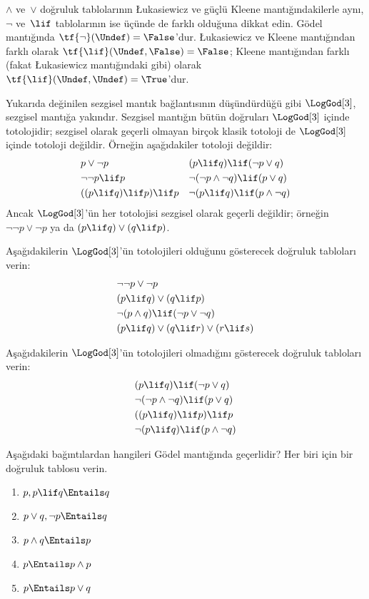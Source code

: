 \documentclass[../../../include/open-logic-section]{subfiles}
\begin{document}
$\land$ ve~$\lor$ doğruluk tablolarının \L ukasiewicz ve güçlü Kleene
mantığındakilerle aynı, $\lnot$ ve~$\lif$ tablolarının ise üçünde de farklı
olduğuna dikkat edin. G\"odel mantığında
$\tf{\lnot}(\Undef) = \False$'dur. \L ukasiewicz ve Kleene mantığından farklı
olarak $\tf{\lif}(\Undef, \False) = \False$; Kleene mantığından farklı
(fakat \L ukasiewicz mantığındaki gibi) olarak
$\tf{\lif}(\Undef, \Undef) = \True$'dur.

Yukarıda değinilen sezgisel mantık bağlantısının düşündürdüğü gibi
$\LogGod[3]$, sezgisel mantığa yakındır. Sezgisel mantığın bütün doğruları
$\LogGod[3]$ içinde totolojidir; sezgisel olarak geçerli olmayan birçok
klasik totoloji de $\LogGod[3]$ içinde totoloji değildir. Örneğin
aşağıdakiler totoloji değildir:
\begin{align*}
  & p \lor \lnot p && (p \lif q) \lif (\lnot p \lor q) \\
  & \lnot\lnot p \lif p && \lnot(\lnot p \land \lnot q) \lif (p \lor q) \\
  & ((p \lif q) \lif p) \lif p && \lnot(p \lif q) \lif (p \land \lnot q)
\end{align*}
Ancak $\LogGod[3]$'ün her totolojisi sezgisel olarak geçerli değildir;
örneğin $\lnot\lnot p \lor \lnot p$ ya da
$(p \lif q) \lor (q \lif p)$.

\begin{prob}
  Aşağıdakilerin $\LogGod[3]$'ün totolojileri olduğunu gösterecek doğruluk
  tabloları verin:
  \begin{align*}
    & \lnot\lnot p \lor \lnot p\\
    & (p \lif q) \lor (q \lif p) \\
    & \lnot(p \land q) \lif (\lnot p \lor \lnot q) \\
    & (p \lif q) \lor (q \lif r) \lor (r \lif s)
  \end{align*}
\end{prob}

\begin{prob}
  Aşağıdakilerin $\LogGod[3]$'ün totolojileri olmadığını gösterecek doğruluk
  tabloları verin:
  \begin{align*}
    & (p \lif q) \lif (\lnot p \lor q) \\
    & \lnot(\lnot p \land \lnot q) \lif (p \lor q) \\
    & ((p \lif q) \lif p) \lif p \\
    & \lnot(p \lif q) \lif (p \land \lnot q)
  \end{align*}
\end{prob}

\begin{prob}
  Aşağıdaki bağıntılardan hangileri G\"odel mantığında geçerlidir? Her biri
  için bir doğruluk tablosu verin.
  \begin{enumerate}
    \item $p, p \lif q \Entails q$
    \item $p \lor q, \lnot p \Entails q$
    \item $p \land q \Entails p$
    \item $p \Entails p \land p$
    \item $p \Entails p \lor q$
  \end{enumerate}
\end{prob}
\end{document}
